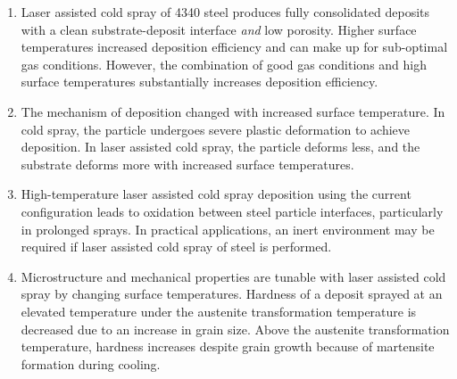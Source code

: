 \begin{enumerate}
	\item Laser assisted cold spray of 4340 steel produces fully consolidated deposits with a clean substrate-deposit interface \textit{and} low porosity. Higher surface temperatures increased deposition efficiency and can make up for sub-optimal gas conditions. However, the combination of good gas conditions and high surface temperatures substantially increases deposition efficiency.
	
	\item The mechanism of deposition changed with increased surface temperature. In cold spray, the particle undergoes severe plastic deformation to achieve deposition. In laser assisted cold spray, the particle deforms less, and the substrate deforms more with increased surface temperatures.
	
	\item High-temperature laser assisted cold spray deposition using the current configuration leads to oxidation between steel particle interfaces, particularly in prolonged sprays. In practical applications, an inert environment may be required if laser assisted cold spray of steel is performed.
	
	\item Microstructure and mechanical properties are tunable with laser assisted cold spray by changing surface temperatures. Hardness of a deposit sprayed at an elevated temperature under the austenite transformation temperature is decreased due to an increase in grain size. Above the austenite transformation temperature, hardness increases despite grain growth because of martensite formation during cooling.
\end{enumerate}


